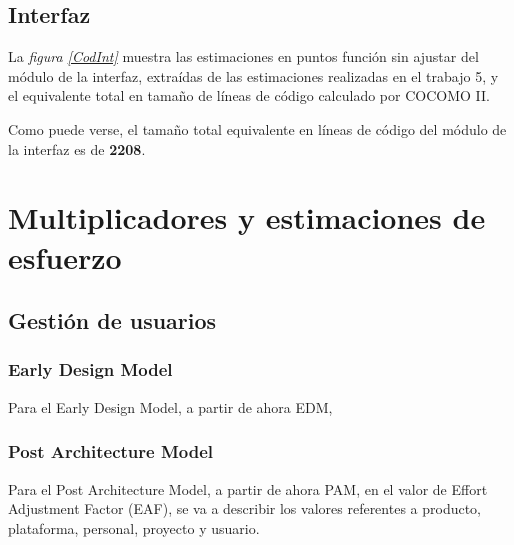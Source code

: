\documentclass[11pt,a4paper,spanish,twoside]{book}
\begin{document}
\section{Interfaz}
La \emph{figura \ref{CodInt}} muestra las estimaciones en puntos función sin
ajustar del módulo de la interfaz, extraídas de las estimaciones realizadas en
el trabajo 5, y el equivalente total en tamaño de líneas de código calculado
por COCOMO II.


Como puede verse, el tamaño total equivalente en líneas de código del módulo
de la interfaz es de \textbf{2208}.

\chapter{Multiplicadores y estimaciones de esfuerzo}
\section{Gestión de usuarios}
\subsection{Early Design Model}
Para el Early Design Model, a partir de ahora EDM,

\subsection{Post Architecture Model}
Para el Post Architecture Model, a partir de ahora PAM, en el valor de Effort
Adjustment Factor (EAF), se va a describir los valores referentes a producto,
plataforma, personal, proyecto y usuario. 
\end{document}
